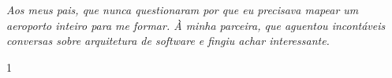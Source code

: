 


\maketitle




\begin{itadedication}
\textit{Aos meus pais, que nunca questionaram por que eu precisava mapear
um aeroporto inteiro para me formar.
À minha parceira, que aguentou incontáveis conversas sobre
arquitetura de software e fingiu achar interessante.
}
\end{itadedication}

%

\thispagestyle{empty}
\ifhyperref{}\fi
\begin{flushright}
\begin{spacing}{1}
\mbox{}\vfill

\end{spacing}
\end{flushright}



\begin{abstract}
\noindent

\end{abstract}

\begin{englishabstract}
\noindent

\end{englishabstract}








\tableofcontents
